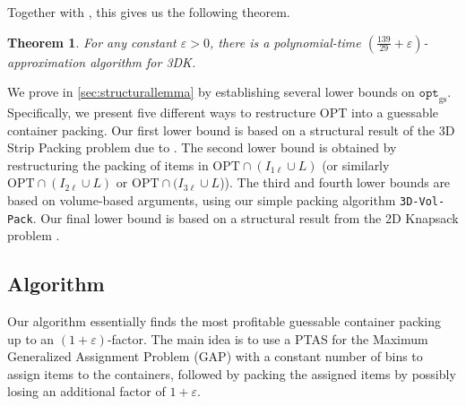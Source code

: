 \documentclass[10pt,a4paper]{amsart}
\newcommand{\ari}[1]{#1}
\renewcommand{\epsilon}{\varepsilon} %
\newcommand{\tdk}{\textsc{3DK}}
\newcommand{\boxes}{containers\xspace}
\newtheorem{theorem}{Theorem}[section]
\theoremstyle{definition}
\newcommand{\opt}{\mathtt{opt}}
\newcommand{\optgs}{\mathtt{opt}_{\mathrm{gs}}}
\begin{document}
Together with , this gives us the following theorem.

\begin{theorem}
    \ari{For any constant $\epsilon >0$, there is a polynomial-time $\left(\frac{139}{29}+\epsilon\right)$-approximation algorithm for \tdk.}
\end{theorem}
We prove  in \cref{sec:structurallemma} by establishing several lower bounds on $\optgs$. Specifically, we present five different ways to restructure OPT into a guessable container packing. Our first lower bound is based on a structural result of the 3D Strip Packing problem due to \cite{3d-strip-packing}.
The second lower bound is obtained by restructuring the packing of items in $\text{OPT}\cap (I_{1\ell}\cup L)$ (or similarly $\text{OPT}\cap (I_{2\ell}\cup L)$ or $\text{OPT}\cap (I_{3\ell} \cup L$)). The third and fourth lower bounds are based on volume-based arguments, \ari{using our simple packing algorithm \texttt{3D-Vol-Pack}.} Our final lower bound is based on a structural result from the 2D Knapsack problem \cite{2dks-Lpacking}.


\iffalse
\subsection{Algorithm}
Our algorithm essentially finds the most profitable guessable container packing up to an $(1+\epsilon)$-factor. The main idea is to use a PTAS for the Maximum Generalized Assignment Problem (GAP) with a constant number of bins to assign items to the \boxes, followed by packing the assigned items by possibly losing an additional factor of $1+\epsilon$.
\end{document}
